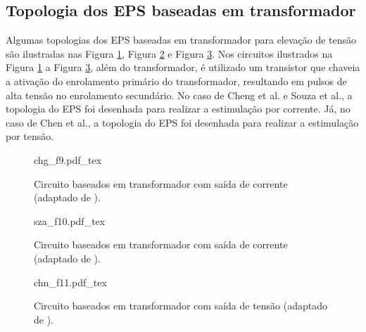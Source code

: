 \subsection*{Topologia dos \acrshort{EPS} baseadas em transformador}

Algumas topologias dos EPS baseadas em transformador para elevação de tensão são ilustradas nas Figura \ref{fig:chg_f9}, Figura \ref{fig:sza_f10} e Figura \ref{fig:chn_f11}. Nos circuitos ilustrados na Figura \ref{fig:chg_f9} a Figura \ref{fig:chn_f11}, além do transformador, é utilizado um transistor que chaveia a ativação do enrolamento primário do transformador, resultando em pulsos de alta tensão no enrolamento secundário. No caso de Cheng et al. e Souza et al., a topologia do \acrshort{EPS} foi desenhada para realizar a estimulação por corrente. Já, no caso de Chen et al., a topologia do \acrshort{EPS} foi desenhada para realizar a estimulação por tensão. 


\begin{figure}[h]
    \centering %
    \small %
    \def\svgwidth{0.75
    \columnwidth}%
    {chg_f9.pdf_tex}
    \caption{Circuito baseados em transformador com saída de corrente (adaptado de \cite{Cheng2004DevelopmentStimulation}).}
    \label{fig:chg_f9}
\end{figure}

\begin{figure}[h]
    \centering %
    \small %
    \def\svgwidth{0.78
    \columnwidth}%
    {sza_f10.pdf_tex}
    \caption{Circuito baseados em transformador com saída de corrente (adaptado de \cite{Souza2012EstagioFuncional}).}
    \label{fig:sza_f10}
\end{figure}

\begin{figure}
    \centering %
    \small %
    \def\svgwidth{0.6
    \columnwidth}%
    {chn_f11.pdf_tex}
    \caption{Circuito baseados em transformador com saída de tensão (adaptado de \cite{Chen2013ADataset}).}
    \label{fig:chn_f11}
\end{figure}

